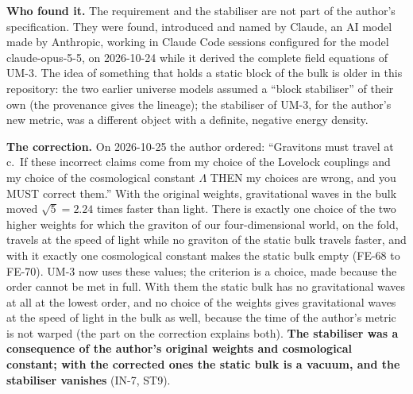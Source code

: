 \documentclass[
  10pt,
]{article}
\begin{document}
\textbf{Who found it.} The requirement and the stabiliser are not part
of the author's specification. They were found, introduced and named by
Claude, an AI model made by Anthropic, working in Claude Code sessions
configured for the model claude-opus-5-5, on 2026-10-24 while it derived
the complete field equations of UM-3. The idea of something that holds a
static block of the bulk is older in this repository: the two earlier
universe models assumed a ``block stabiliser'' of their own (the
provenance gives the lineage); the stabiliser of UM-3, for the author's
new metric, was a different object with a definite, negative energy
density.

\textbf{The correction.} On 2026-10-25 the author ordered: ``Gravitons
must travel at c.~If these incorrect claims come from my choice of the
Lovelock couplings and my choice of the cosmological constant
\(\Lambda\) THEN my choices are wrong, and you MUST correct them.'' With
the original weights, gravitational waves in the bulk moved
\(\sqrt5 = 2.24\) times faster than light. There is exactly one choice
of the two higher weights for which the graviton of our four-dimensional
world, on the fold, travels at the speed of light while no graviton of
the static bulk travels faster, and with it exactly one cosmological
constant makes the static bulk empty (FE-68 to FE-70). UM-3 now uses
these values; the criterion is a choice, made because the order cannot
be met in full. With them the static bulk has no gravitational waves at
all at the lowest order, and no choice of the weights gives
gravitational waves at the speed of light in the bulk as well, because
the time of the author's metric is not warped (the part on the
correction explains both). \textbf{The stabiliser was a consequence of
the author's original weights and cosmological constant; with the
corrected ones the static bulk is a vacuum, and the stabiliser vanishes}
(IN-7, ST9).
\end{document}
